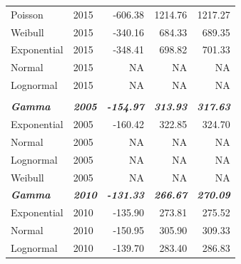 \documentclass[
11pt, %
oneside, %
english, %
singlespacing, %
]{macthesis} %
\begin{document}
\begin{table}
\begin{tabular}{llrrr}
\hspace{1em}Poisson & 2015 & -606.38 & 1214.76 & 1217.27\\
\hspace{1em}Weibull & 2015 & -340.16 & 684.33 & 689.35\\
\hspace{1em}Exponential & 2015 & -348.41 & 698.82 & 701.33\\
\hspace{1em}Normal & 2015 & NA & NA & NA\\
\hspace{1em}Lognormal & 2015 & NA & NA & NA\\
\addlinespace[0.3em]
\multicolumn{5}{l}{\textbf{Destination: Place of worship}}\\
\begingroup\fontsize{10}{12}\selectfont \em{\textbf{\hspace{1em}Gamma}}\endgroup & \begingroup\fontsize{10}{12}\selectfont \em{\textbf{2005}}\endgroup & \begingroup\fontsize{10}{12}\selectfont \em{\textbf{-154.97}}\endgroup & \begingroup\fontsize{10}{12}\selectfont \em{\textbf{313.93}}\endgroup & \begingroup\fontsize{10}{12}\selectfont \em{\textbf{317.63}}\endgroup\\
\hspace{1em}Exponential & 2005 & -160.42 & 322.85 & 324.70\\
\hspace{1em}Normal & 2005 & NA & NA & NA\\
\hspace{1em}Lognormal & 2005 & NA & NA & NA\\
\hspace{1em}Weibull & 2005 & NA & NA & NA\\
\begingroup\fontsize{10}{12}\selectfont \em{\textbf{\hspace{1em}Gamma}}\endgroup & \begingroup\fontsize{10}{12}\selectfont \em{\textbf{2010}}\endgroup & \begingroup\fontsize{10}{12}\selectfont \em{\textbf{-131.33}}\endgroup & \begingroup\fontsize{10}{12}\selectfont \em{\textbf{266.67}}\endgroup & \begingroup\fontsize{10}{12}\selectfont \em{\textbf{270.09}}\endgroup\\
\hspace{1em}Exponential & 2010 & -135.90 & 273.81 & 275.52\\
\hspace{1em}Normal & 2010 & -150.95 & 305.90 & 309.33\\
\hspace{1em}Lognormal & 2010 & -139.70 & 283.40 & 286.83\\

\end{tabular}
\end{table}
\end{document}
